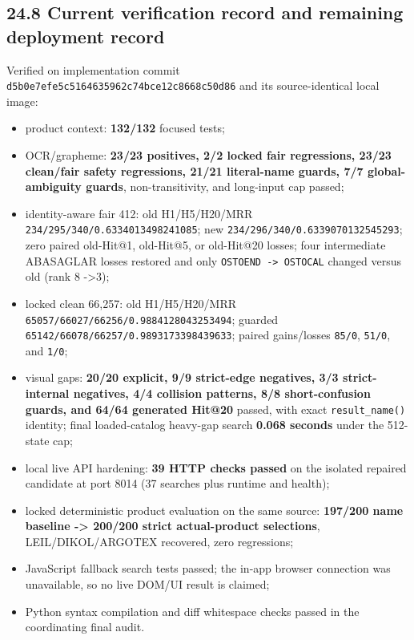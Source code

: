 \subsection{24.8 Current verification record and remaining deployment record}\label{248-current-verification-record-and-remaining-deployment-record}

Verified on implementation commit \texttt{d5b0e7efe5c5164635962c74bce12c8668c50d86} and its source-identical local image:

\begin{itemize}
\tightlist
\item
  product context: \textbf{132/132} focused tests;
\item
  OCR/grapheme: \textbf{23/23 positives, 2/2 locked fair regressions, 23/23 clean/fair safety regressions, 21/21 literal-name guards, 7/7 global-ambiguity guards}, non-transitivity, and long-input cap passed;
\item
  identity-aware fair 412: old H1/H5/H20/MRR \texttt{234/295/340/0.6334013498241085}; new \texttt{234/296/340/0.6339070132545293}; zero paired old-Hit@1, old-Hit@5, or old-Hit@20 losses; four intermediate ABASAGLAR losses restored and only \texttt{OSTOEND\ -\textgreater{}\ OSTOCAL} changed versus old (rank 8 -\textgreater3);
\item
  locked clean 66,257: old H1/H5/H20/MRR \texttt{65057/66027/66256/0.9884128043253494}; guarded \texttt{65142/66078/66257/0.9893173398439633}; paired gains/losses \texttt{85/0}, \texttt{51/0}, and \texttt{1/0};
\item
  visual gaps: \textbf{20/20 explicit, 9/9 strict-edge negatives, 3/3 strict-internal negatives, 4/4 collision patterns, 8/8 short-confusion guards, and 64/64 generated Hit@20} passed, with exact \texttt{result\_\allowbreak{}name()} identity; final loaded-catalog heavy-gap search \textbf{0.068 seconds} under the 512-state cap;
\item
  local live API hardening: \textbf{39 HTTP checks passed} on the isolated repaired candidate at port 8014 (37 searches plus runtime and health);
\item
  locked deterministic product evaluation on the same source: \textbf{197/200 name baseline -\textgreater{} 200/200 strict actual-product selections}, LEIL/DIKOL/ARGOTEX recovered, zero regressions;
\item
  JavaScript fallback search tests passed; the in-app browser connection was unavailable, so no live DOM/UI result is claimed;
\item
  Python syntax compilation and diff whitespace checks passed in the coordinating final audit.
\end{itemize}

